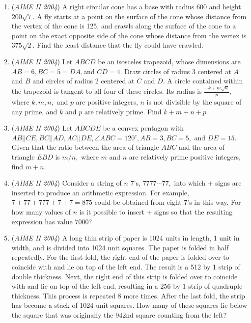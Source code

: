 \begin{enumerate}
	\item (\textit{AIME II 2004}) A right circular cone has a base with radius 600 and height $200\sqrt{7}.$ A fly starts at a point on the surface of the cone whose distance from the vertex of the cone is 125, and crawls along the surface of the cone to a point on the exact opposite side of the cone whose distance from the vertex is $375\sqrt{2}.$ Find the least distance that the fly could have crawled.


 

	\item (\textit{AIME II 2004}) Let $ABCD$ be an isosceles trapezoid, whose dimensions are $AB = 6, BC=5=DA,$and $CD=4.$ Draw circles of radius 3 centered at $A$ and $B$ and circles of radius 2 centered at $C$ and $D.$ A circle contained within the trapezoid is tangent to all four of these circles. Its radius is $\frac{-k+m\sqrt{n}}p,$ where $k, m, n,$ and $p$ are positive integers, $n$ is not divisible by the square of any prime, and $k$ and $p$ are relatively prime. Find $k+m+n+p.$


	\item (\textit{AIME II 2004}) Let $ABCDE$ be a convex pentagon with $AB || CE, BC || AD, AC || DE, \angle ABC=120^\circ, AB=3, BC=5,$ and $DE = 15.$ Given that the ratio between the area of triangle $ABC$ and the area of triangle $EBD$ is $m/n,$ where $m$ and $n$ are relatively prime positive integers, find $m+n.$


	\item (\textit{AIME II 2004}) Consider a string of $n$ $7$'s, $7777\cdots77,$ into which $+$ signs are inserted to produce an arithmetic expression. For example, $7+77+777+7+7=875$ could be obtained from eight $7$'s in this way. For how many values of $n$ is it possible to insert $+$ signs so that the resulting expression has value $7000$?


 

	\item (\textit{AIME II 2004}) A long thin strip of paper is 1024 units in length, 1 unit in width, and is divided into 1024 unit squares. The paper is folded in half repeatedly. For the first fold, the right end of the paper is folded over to coincide with and lie on top of the left end. The result is a 512 by 1 strip of double thickness. Next, the right end of this strip is folded over to coincide with and lie on top of the left end, resulting in a 256 by 1 strip of quadruple thickness. This process is repeated 8 more times. After the last fold, the strip has become a stack of 1024 unit squares. How many of these squares lie below the square that was originally the 942nd square counting from the left?


 

\end{enumerate}